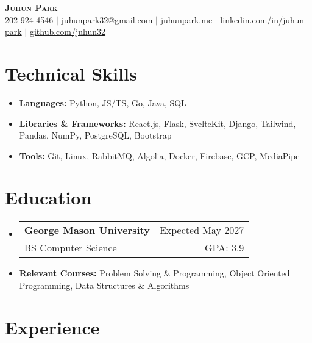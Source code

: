 \documentclass[letterpaper,11pt]{article}
\makeatletter
\newcommand{\resumeItem}[1]{
  \item{
    {#1}
  }
}
\newcommand{\resumeItemThin}[1]{
  \item{
    {#1 \vspace{-5pt}}
  }
}
\newcommand{\resumeSubheading}[4]{
    \item
    \begin{tabular*}{0.985\textwidth}[t]{l@{\extracolsep{\fill}}r@{\hspace{-0.1in}}}
        {\textbf{#1}} & {#2} \\
        #3 &  #4 \\
    \end{tabular*}\vspace{-5pt}
}
\newcommand{\resumeSubHeadingListStart}{\begin{itemize}[leftmargin=0.00in, rightmargin=-0.2in, label={}]\vspace{3pt}}
\newcommand{\resumeSubHeadingListEnd}{\end{itemize}\vspace{-5pt}}
\newcommand{\resumeItemListStart}{\vspace{3pt}\begin{itemize}[leftmargin=0.15in, rightmargin=0.15in]}
\newcommand{\resumeItemListEnd}{\end{itemize}\vspace{-5pt}}
\makeatother
\begin{document}

\begin{center}
  \textbf{\Huge \scshape {Juhun Park}} \\ \vspace{3pt}
   202-924-4546 $|$
  \href{mailto:juhunpark32@gmail.com}{juhunpark32@gmail.com} $|$
  \href{https://www.juhunpark.me/}{juhunpark.me} $|$
  \href{https://linkedin.com/in/juhun-park}{linkedin.com/in/juhun-park} $|$
  \href{https://github.com/juhun32}{github.com/juhun32} \\
\end{center}

\vspace{-10pt}


\section{Technical Skills}
\resumeItemListStart
\resumeItemThin{\textbf{Languages: }{Python, JS/TS, Go, Java, SQL}}\\
\resumeItemThin{\textbf{Libraries \& Frameworks: }{React.js, Flask, SvelteKit, Django, Tailwind, Pandas, NumPy, PostgreSQL, Bootstrap}}\\
\resumeItemThin{\textbf{Tools: }{Git, Linux, RabbitMQ, Algolia, Docker, Firebase, GCP, MediaPipe}}\\

\resumeItemListEnd


\section{Education}
\resumeSubHeadingListStart
\resumeSubheading
{George Mason University}{Expected May 2027}
{BS Computer Science}{GPA: 3.9}
\resumeItem{\textbf{Relevant Courses: }{Problem Solving \& Programming, Object Oriented Programming, Data Structures \& Algorithms}}
\vspace{-5pt}
\resumeSubHeadingListEnd


\section{Experience}
\end{document}
